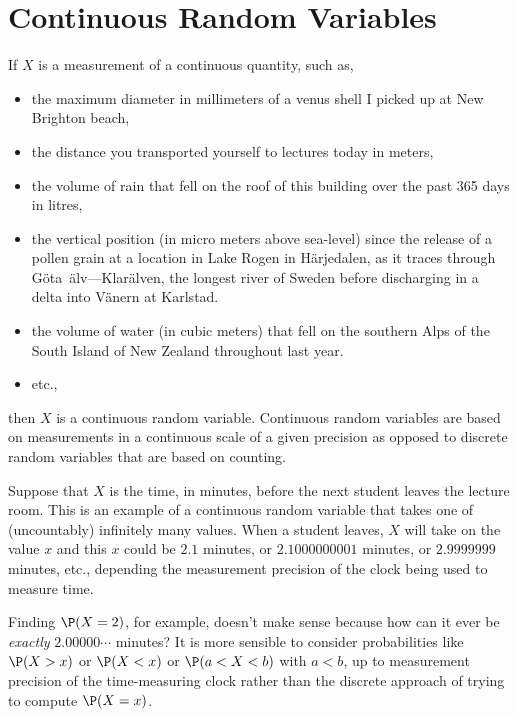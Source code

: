 

\section{Continuous Random Variables}\label{S:ContRVs}

If $X$ is a measurement of a continuous quantity, such as,
\begin{itemize}
\item the maximum diameter in millimeters of a venus shell I picked up at New Brighton beach, 
\item the distance you transported yourself to lectures today in meters, 
\item the volume of rain that fell on the roof of this building over the past 365 days in litres,
\item the vertical position (in micro meters above sea-level) since the release of a pollen grain at a location in Lake Rogen in H\"arjedalen, as it traces through G\"ota~\"alv—Klar\"alven, the longest river of Sweden before discharging in a delta into V\"anern at Karlstad. 
\item the volume of water (in cubic meters) that fell on the southern Alps of the South Island of New Zealand throughout last year.  
\item etc.,
\end{itemize}
then $X$ is a continuous random variable. Continuous random variables are based on measurements in a continuous scale of a given precision as opposed to discrete random variables that are based on counting.

\begin{example}\label{EgTimeStudentLeaves}
Suppose that  $X$ is  the time, in minutes, before the next student
  leaves the lecture room. This is an example of a  continuous random
  variable that takes one of (uncountably)  infinitely many values.
  When a student leaves, $X$ will take on the value $x$ and this $x$
  could be $2.1$ minutes, or $2.1000000001$ minutes,  or $2.9999999$
  minutes, etc., depending the measurement precision of the clock being used to measure time.  

Finding $\P(X=2)$, for example,  doesn't make sense because
  how can it ever be {\em exactly} $2.00000 \cdots$ minutes? It is more
  sensible to consider  probabilities like  $\P(X>x)$ or $\P(X<x)$ or $\P(a < X < b)$ with $a < b$, up to measurement precision of the time-measuring clock rather
  than the discrete approach of trying to compute $\P(X=x)$.
\end{example}


